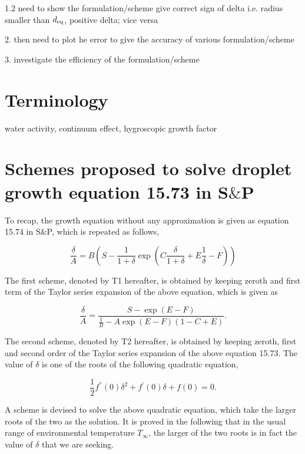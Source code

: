 \documentclass[12pt]{article}
\begin{document}
1.2 need to show the formulation/scheme give correct sign of delta
i.e. radius smaller than $d_{\rm eq}$, positive delta; vice versa


2. then need to plot he error to give the accuracy of various formulation/scheme


3. investigate the efficiency of the formulation/scheme

\section{Terminology}

water activity,
continuum effect,
hygroscopic growth factor


\section{Schemes proposed to solve droplet growth equation 15.73 in S$\&$P} 

To recap, the growth equation without any approximation is given as equation 15.74 in S$\&$P, which is repeated as follows,

\begin{equation}
\frac{\delta}{A}=B(S-\frac{1}{1+\delta}\exp(C\frac{\delta}{1+\delta}+E\frac{1}{\delta}-F))
\end{equation}


The first scheme, denoted by T1 hereafter, is obtained by keeping zeroth and first term of the Taylor series expansion of the above equation, which is given as 

\begin{equation}
\frac{\delta}{A}=\frac{S-\exp(E-F)}{\frac{1}{B}-A\exp(E-F)(1-C+E)}.
\end{equation}

The second scheme, denoted by T2 hereafter, is obtained by keeping zeroth, first and second order of the Taylor series expansion of the above equation 15.73. The value of $\delta$ is one of the roots of the following quadratic equation,

\begin{equation}\label{eqn:73}
\frac{1}{2}f^{''}(0)\delta^{2}+f^{'}(0)\delta+f(0)=0.
\end{equation}

A scheme is devised to solve the above quadratic equation, which take the larger roots of the two as the solution. 
It is proved in the following that in the usual range of environmental temperature $T_{\infty}$,  the larger of the two roots is in fact the value of $\delta$ that we are seeking. 
\end{document}
